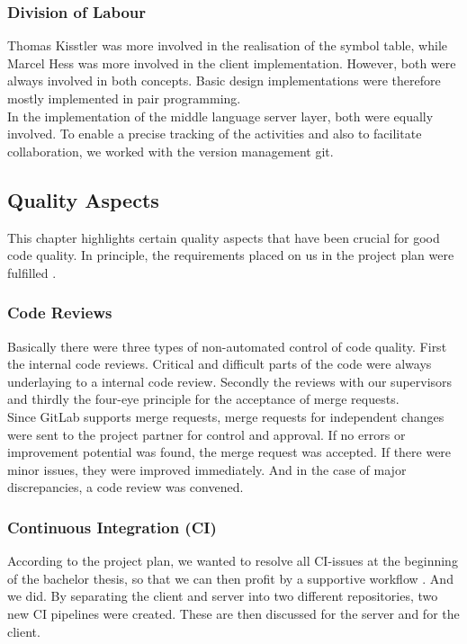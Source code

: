 \subsubsection{Division of Labour}
Thomas Kisstler was more involved in the realisation of the symbol table,
while Marcel Hess was more involved in the client implementation.
However, both were always involved in both concepts.
Basic design implementations were therefore mostly implemented in pair programming.\\

In the implementation of the middle language server layer, both were equally involved.
To enable a precise tracking of the activities and also to facilitate collaboration,
we worked with the version management git.

\subsection{Quality Aspects}
This chapter highlights certain quality aspects that have been crucial for good code quality.
In principle, the requirements placed on us in the project plan were fulfilled \cite{projectplan}.

\subsubsection{Code Reviews}
Basically there were three types of non-automated control of code quality.
First the internal code reviews. Critical and difficult parts of the code were always underlaying to a internal code review.
Secondly the reviews with our supervisors and
thirdly the four-eye principle for the acceptance of merge requests. \\

Since GitLab supports merge requests,
merge requests for independent changes were sent to the project partner for control and approval.
If no errors or improvement potential was found, the merge request was accepted.
If there were minor issues, they were improved immediately.
And in the case of major discrepancies, a code review was convened.

\subsubsection{Continuous Integration (CI)}
According to the project plan,
we wanted to resolve all CI-issues at the beginning of the bachelor thesis,
so that we can then profit by a supportive workflow \cite{projectplan}. And we did.
By separating the client and server into two different repositories, two new CI pipelines were created.
These are then discussed for the server and for the client. \\

